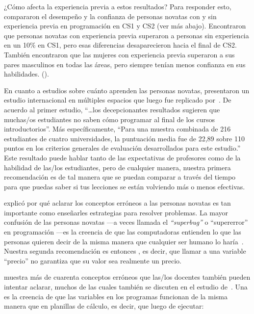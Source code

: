 ¿Cómo afecta la experiencia previa a estos resultados?
Para responder esto,
\cite{Wilc2018} compararon el desempeño y la confianza de personas novatas
con y sin experiencia previa en programación en CS1 y CS2 (ver más abajo).
Encontraron que personas novatas con experiencia previa superaron a personas sin experiencia en un 10\% en CS1,
pero esas diferencias desaparecieron hacia el final de CS2.
También encontraron que las mujeres con experiencia previa superaron a sus pares masculinos en todas las áreas,
pero siempre tenían menos confianza en sus habilidades. ().

En cuanto a estudios sobre cuánto aprenden las personas novatas,
\cite{McCr2001} presentaron un estudio internacional en múltiples espacios que luego fue replicado por~\cite{Utti2013}.
De acuerdo al primer estudio,
``{\ldots}los decepcionantes resultados sugieren que
muchas/os estudiantes no saben cómo programar al final de los cursos introductorios''.
Más específicamente,
``Para una muestra combinada de 216 estudiantes de cuatro universidades,
la puntuación media fue de 22,89 sobre 110 puntos en los criterios generales de evaluación desarrollados para este estudio.''
Este resultado puede hablar tanto de las expectativas de profesores como de la habilidad de las/los estudiantes,
pero de cualquier manera,
nuestra primera recomendación es 
de tal manera que se puedan comparar a través del tiempo para que puedas saber si tus lecciones se están volviendo más o menos efectivas.


 explicó por qué aclarar los conceptos erróneos a las personas novatas es tan importante como enseñarles
estrategias para resolver problemas.
La mayor confusión de las personas novatas ---a veces llamada el \emph{``superbug''} o ``supererror'' en programación ---es
la creencia de que las computadoras entienden lo que las personas quieren decir de la misma manera que cualquier ser humano lo haría~\cite{Pea1986}.
Nuestra segunda recomendación es entonces ,
es decir, que llamar a una variable ``precio'' no garantiza que su valor sea realmente un precio.

\cite{Sorv2018} muestra más de cuarenta conceptos erróneos que las/los docentes también pueden intentar aclarar,
muchos de las cuales también se discuten en el estudio de~\cite{Qian2017}.
Una es la creencia de que las variables en los programas funcionan de la misma manera que en planillas de cálculo,
es decir, que luego de ejecutar:

